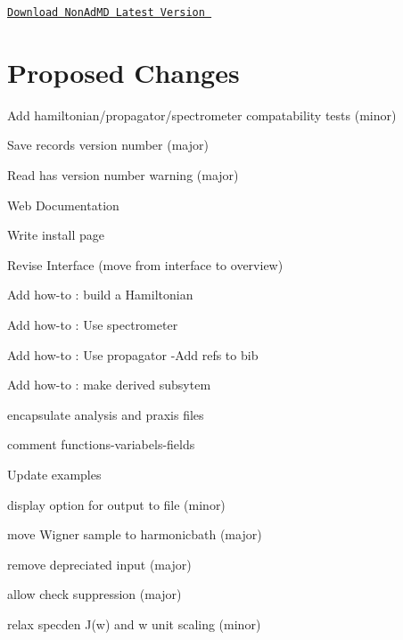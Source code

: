 \href{nonadmd-0.1.41-alpha.tar.gz}{\tt Download Non\-Ad\-M\-D Latest Version }

  \hypertarget{_tags_Wishlist}{}\section{Proposed Changes}\label{_tags_Wishlist}

\begin{DoxyItemize}
\item Add hamiltonian/propagator/spectrometer compatability tests (minor)
\item Save records version number (major)
\item Read has version number warning (major)
\end{DoxyItemize}


\begin{DoxyItemize}
\item Web Documentation
\begin{DoxyItemize}
\item Write install page
\end{DoxyItemize}
\item Revise Interface (move from interface to overview)
\begin{DoxyItemize}
\item Add how-\/to \-: build a Hamiltonian
\item Add how-\/to \-: Use spectrometer
\item Add how-\/to \-: Use propagator -\/\-Add refs to bib
\end{DoxyItemize}
\item Add how-\/to \-: make derived subsytem
\item encapsulate analysis and praxis files
\item comment functions-\/variabels-\/fields
\end{DoxyItemize}


\begin{DoxyItemize}
\item Update examples
\end{DoxyItemize}


\begin{DoxyItemize}
\item display option for output to file (minor)
\item move Wigner sample to harmonicbath (major)
\item remove depreciated input (major)
\item allow check suppression (major)
\item relax specden J(w) and w unit scaling (minor)
\end{DoxyItemize}


